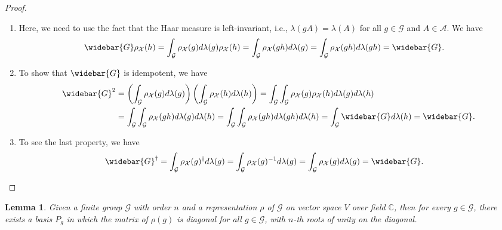 \documentclass{article}
\theoremstyle{plain}
\newtheorem{lemma}[theorem]{Lemma}
\theoremstyle{definition}
\theoremstyle{remark}
\theoremstyle{remark}
\begin{document}
   \begin{proof} 
    ~\begin{enumerate}
      \item Here, we need to use the fact that the Haar measure is left-invariant, i.e., $\lambda(gA) = \lambda(A)$ for all $g \in \mathcal{G}$ and $A \in \mathcal{A}$. We have
      \begin{align}
        \widebar{G} \rho_{\mathcal{X}}(h) &= \int_{\mathcal{G}} \rho_{\mathcal{X}}(g) d\lambda(g)  \rho_{\mathcal{X}}(h)= \int_{\mathcal{G}} \rho_{\mathcal{X}}(gh) d\lambda(g) = \int_{\mathcal{G}} \rho_{\mathcal{X}}(gh) d\lambda(gh) = \widebar{G}.
      \end{align}
  
      \item To show that $\widebar{G}$ is idempotent, we have
      \begin{align}
        \widebar{G}^2 &= \left(\int_{\mathcal{G}}  \rho_{\mathcal{X}}(g) d\lambda(g)\right)\left(\int_{\mathcal{G}}  \rho_{\mathcal{X}}(h) d\lambda(h)\right) = \int_{\mathcal{G}} \int_{\mathcal{G}} \rho_{\mathcal{X}}(g)  \rho_{\mathcal{X}}(h) d\lambda(g) d\lambda(h) \nonumber \\
        &= \int_{\mathcal{G}} \int_{\mathcal{G}} \rho_{\mathcal{X}}(gh) d\lambda(g) d\lambda(h) = \int_{\mathcal{G}} \int_{\mathcal{G}} \rho_{\mathcal{X}}(gh) d\lambda(gh) d\lambda(h) = \int_{\mathcal{G}} \widebar{G} d\lambda(h) = \widebar{G}.
      \end{align}
        
      \item To see the last property, we have
      \begin{align}
        \widebar{G}^{\dagger} &= \int_{\mathcal{G}}  \rho_{\mathcal{X}}(g)^{\dagger} d\lambda(g) = \int_{\mathcal{G}}  \rho_{\mathcal{X}}(g)^{-1} d\lambda(g) = \int_{\mathcal{G}} \rho_{\mathcal{X}}(g) d\lambda(g) = \widebar{G}.
      \end{align}
    \end{enumerate}
  \end{proof}

    \begin{lemma} \label{lem:diagonalization_finite}
      Given a finite group $\mathcal{G}$ with order $n$ and a representation $\rho$ of $\mathcal{G}$ on vector space $V$ over field $\mathbb{C}$, then for every $g \in \mathcal{G}$, there exists a basis $P_g$ in which the matrix of $\rho(g)$ is diagonal for all $g \in \mathcal{G}$, with $n$-th roots of unity on the diagonal.
    \end{lemma}
    
\end{document}
